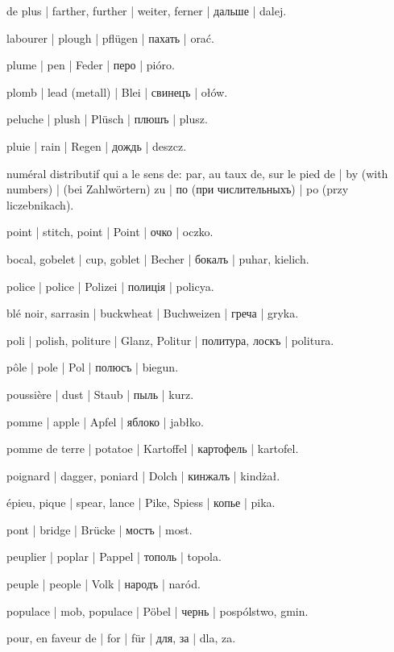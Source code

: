 \begin{outdent}{1em}
de plus | farther, further | weiter, ferner | дальше | dalej.

labourer | plough | pflügen | пахать | orać.

plume | pen | Feder | перо | pióro.

plomb | lead (metall) | Blei | свинецъ | ołów.

peluche | plush | Plüsch | плюшъ | plusz.

pluie | rain | Regen | дождь | deszcz.

numéral distributif qui a le sens de: par, au taux de, sur le
pied de | by (with numbers) | (bei Zahlwörtern) zu | по (при
числительныхъ) | po (przy liczebnikach).

point | stitch, point | Point | очко | oczko.

bocal, gobelet | cup, goblet | Becher | бокалъ | puhar,
kielich.

police | police | Polizei | полиція | policya.

blé noir, sarrasin | buckwheat | Buchweizen | греча | gryka.

poli | polish, politure | Glanz, Politur | политура, лоскъ | politura.

pôle | pole | Pol | полюсъ | biegun.

poussière | dust | Staub | пыль | kurz.

pomme | apple | Apfel | яблоко | jabłko.

\uvsubentry{}
pomme de terre | potatoe | Kartoffel | картофель | kartofel.

poignard | dagger, poniard | Dolch | кинжалъ | kindżał.

\uvsubentry{}
épieu, pique | spear, lance | Pike, Spiess | копье | pika.

pont | bridge | Brücke | мостъ | most.

peuplier | poplar | Pappel | тополь | topola.

peuple | people | Volk | народъ | naród.

\uvsubentry{}
populace | mob, populace | Pöbel | чернь | pospólstwo, gmin.

pour, en faveur de | for | für | для, за | dla, za.


\end{outdent}
